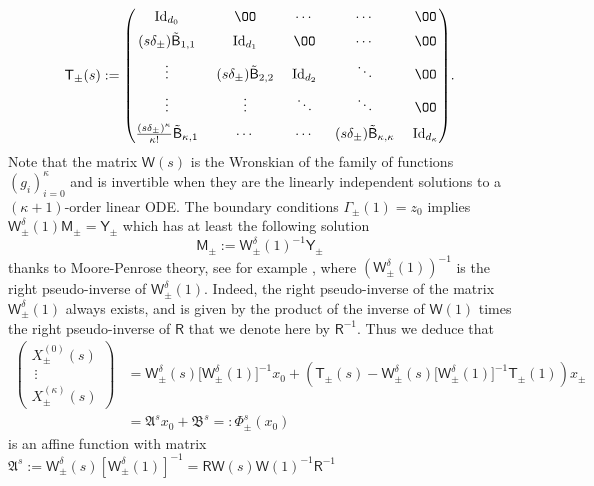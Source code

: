 \documentclass[JEP,XML,SOM,Unicode,NoFloatCountersInSection,published]{cedram}
\theoremstyle{definition}
\newcommand{\sB}{{\mathsf B}}
\newcommand{\sW}{{\mathsf W}}
\newcommand{\sT}{{\mathsf T}}
\newcommand{\I}{\textup{Id}}\let\Id\I
\begin{document}
\begin{align}
\sT_\pm (s) :=\arraycolsep6.5pt \begin{pmatrix}
\I_{d_0} & \OO & \cdots & \cdots & \OO \\[5pt]
(s\delta_\pm) \tilde \sB_{1,1} & \Id_{d_1} & \OO & \cdots & \OO \\[5pt]
\vdots & (s \delta_\pm) \tilde \sB_{2,2} & \Id_{d_2} & \ddots & \OO \\[5pt]
\vdots & \vdots & \ddots & \ddots & \OO \\[5pt]
\frac{(s\delta_\pm)^\kappa}{\kappa!} \tilde \sB_{\kappa,1} &
\cdots & \cdots & (s \delta_\pm) \tilde \sB_{\kappa,\kappa} & \Id_{d_\kappa}
\end{pmatrix}\!.
\end{align}
Note that the matrix $\sW(s)$ is the Wronskian of the family of
functions $(g_i)_{i=0} ^\kappa$ and is invertible when they are
the linearly independent solutions to a $(\kappa+1)$-order linear
ODE. The boundary conditions $\Gamma_\pm(1)=z_0$ implies
$
\sW_\pm ^\delta (1) \mathsf M_\pm = \mathsf Y_\pm $ which has at least the following solution
\begin{equation*}
\mathsf M_\pm := \sW_\pm ^\delta (1)^{-1}\mathsf Y_\pm
\end{equation*}
thanks to Moore-Penrose theory, see for example \cite{Barata-Hussein}, where $(\sW_\pm ^\delta (1))^{-1}$ is the right pseudo-inverse of $\sW_\pm ^\delta (1)$.
Indeed, the right pseudo-inverse of the matrix $\sW_\pm ^\delta (1)$ always exists, and is given by the product of the inverse of $\sW(1)$ times the right pseudo-inverse of $\mathsf R$ that we denote here by ${\mathsf R}^{-1}$.
Thus we deduce that
\begin{equation}\label{eq:mapping}
\begin{aligned}
\begin{pmatrix}
X^{(0)}_\pm (s) \\\
\vdots \\
X^{(\kappa)}_\pm (s)
\end{pmatrix}
&= \sW_\pm ^\delta (s) \big[\sW_\pm ^\delta
(1)\big]^{-1} x_0
+ \left(\sT_{\pm} (s) - \sW_\pm ^\delta (s) \big[\sW_\pm ^\delta
(1)\big]^{-1} \sT_{\pm} (1) \right) x_\pm \\
& = \mathfrak A^s x_0 + \mathfrak B^s =: \Phi^s_\pm (x_0)
\end{aligned}
\end{equation}
is an affine function with matrix
$\mathfrak A^s:=\sW_\pm ^\delta (s) [\sW_\pm ^\delta (1)]^{-1} = \mathsf R \mathsf W (s) \mathsf W(1)^{-1} \mathsf R^{-1}$
\end{document}
